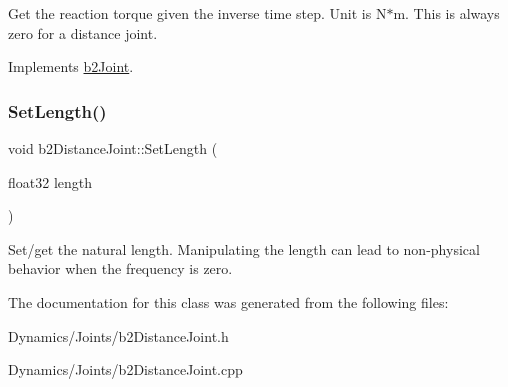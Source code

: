 Get the reaction torque given the inverse time step. Unit is N$\ast$m. This is always zero for a distance joint. 

Implements \mbox{\hyperlink{classb2Joint_ae355e441c2aa842777dc04e24f15ced0}{b2\+Joint}}.

\mbox{\label{classb2DistanceJoint_a950a0f187ef691208e50de40ed9223fe}} 
\subsubsection{\texorpdfstring{Set\+Length()}{SetLength()}}
{\footnotesize\ttfamily void b2\+Distance\+Joint\+::\+Set\+Length (\begin{DoxyParamCaption}\item[{float32}]{length }\end{DoxyParamCaption})\hspace{0.3cm}{\ttfamily [inline]}}

Set/get the natural length. Manipulating the length can lead to non-\/physical behavior when the frequency is zero. 

The documentation for this class was generated from the following files\+:\begin{DoxyCompactItemize}
\item 
Dynamics/\+Joints/b2\+Distance\+Joint.\+h\item 
Dynamics/\+Joints/b2\+Distance\+Joint.\+cpp\end{DoxyCompactItemize}

